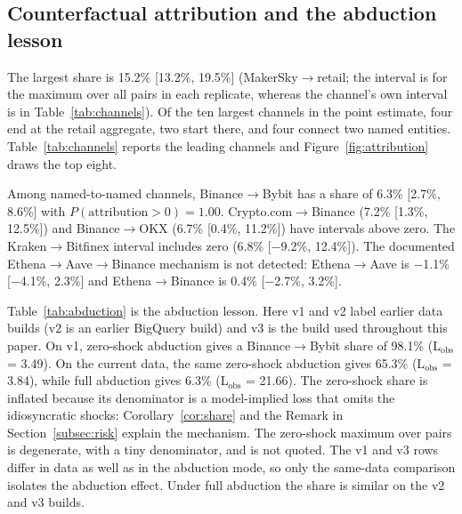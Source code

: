 \documentclass[referee,pdflatex,sn-mathphys-ay]{sn-jnl}
\theoremstyle{thmstyleone}%
\theoremstyle{thmstyletwo}%
\theoremstyle{thmstylethree}%
\begin{document}
\subsection{Counterfactual attribution and the abduction lesson}
\label{subsec:attribution}
The largest share is 15.2\% [13.2\%, 19.5\%] (MakerSky$\to$retail; the interval is for the maximum over all pairs in each replicate, whereas the channel's own interval is in Table~\ref{tab:channels}). Of the ten largest channels
in the point estimate, four end at the retail aggregate, two start there, and four connect two named entities.
Table~\ref{tab:channels} reports the leading channels and Figure~\ref{fig:attribution} draws the top eight.

Among named-to-named channels, Binance$\to$Bybit has a share of 6.3\% [2.7\%, 8.6\%] with
$P(\text{attribution}>0)=1.00$. Crypto.com$\to$Binance (7.2\% [1.3\%, 12.5\%]) and
Binance$\to$OKX (6.7\% [0.4\%, 11.2\%]) have intervals above zero. The Kraken$\to$Bitfinex interval includes
zero (6.8\% [$-$9.2\%, 12.4\%]). The documented Ethena$\to$Aave$\to$Binance mechanism is not detected: Ethena$\to$Aave
is $-$1.1\% [$-$4.1\%, 2.3\%] and Ethena$\to$Binance is 0.4\% [$-$2.7\%, 3.2\%].

Table~\ref{tab:abduction} is the abduction lesson. Here v1 and v2 label earlier data builds (v2 is an earlier
BigQuery build) and v3 is the build used throughout this paper. On v1, zero-shock abduction gives a
Binance$\to$Bybit share of 98.1\% (L$_{\text{obs}}$ = 3.49). On the current data, the same
zero-shock abduction gives 65.3\% (L$_{\text{obs}}$ = 3.84), while full abduction gives
6.3\% (L$_{\text{obs}}$ = 21.66). The zero-shock share is inflated because its denominator is a
model-implied loss that omits the idiosyncratic shocks: Corollary~\ref{cor:share} and the Remark in
Section~\ref{subsec:risk} explain the mechanism. The zero-shock maximum over pairs is degenerate, with a tiny
denominator, and is not quoted. The v1 and v3 rows differ in data as well as in the
abduction mode, so only the same-data comparison isolates the abduction effect. Under full abduction the share is similar on the
v2 and v3 builds.
\end{document}
